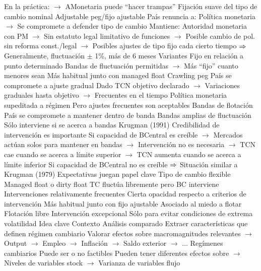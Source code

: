 \documentclass{nuevotema}
\begin{document}
\begin{esquemal}
				\4[] En la práctica:
				\4[] $\to$ AMonetaria puede ``hacer trampas''
		\2 Fijación suave del tipo de cambio nominal
			\3 Adjustable peg/fijo ajustable
				\4 País renuncia a:
				\4[] Política monetaria
				\4[] $\to$ Se compromete a defender tipo de cambio
				\4 Mantiene:
				\4[] Autoridad monetaria con PM
				\4[] $\to$ Sin estatuto legal limitativo de funciones
				\4[] $\to$ Posible cambio de pol. sin reforma const./legal
				\4[] $\to$ Posibles ajustes de tipo fijo cada cierto tiempo
				\4[] $\then$ Generalmente, fluctuación $\pm$ 1\%, más de 6 meses
				\4 Variantes
				\4[] Fijo en relación a punto determinado
				\4[] Bandas de fluctuación permitidas
				\4[] $\to$ Más ``fijo'' cuanto menores sean
				\4 Más habitual junto con managed float
			\3 Crawling peg
				\4 País se compromete a ajuste gradual
				\4[] Dado TCN objetivo declarado
				\4[] $\to$ Variaciones graduales hasta objetivo
				\4[] $\to$ Frecuentes en el tiempo
				\4 Política monetaria supeditada a régimen
				\4[] Pero ajustes frecuentes son aceptables
			\3 Bandas de flotación
				\4 País se compromete a mantener dentro de banda
				\4 Bandas amplias de fluctuación
				\4[] Sólo interviene si se acerca a bandas
				\4 Krugman (1991)
				\4[] Credibilidad de intervención es importante
				\4[] Si capacidad de BCentral es creíble
				\4[] $\to$ Mercados actúan solos para mantener en bandas
				\4[] $\to$ Intervención no es necesaria
				\4[] $\to$ TCN cae cuando se acerca a límite superior
				\4[] $\to$ TCN aumenta cuando se acerca a límite inferior
				\4[] Si capacidad de BCentral no es creíble
				\4[] $\then$ Situación similar a Krugman (1979)
				\4[$\then$] Expectativas juegan papel clave
		\2 Tipo de cambio flexible
			\3 Managed float o dirty float
				\4 TC fluctúa libremente pero BC interviene
				\4 Intervenciones relativamente frecuentes
				\4 Cierta opacidad respecto a criterios de intervención
				\4 Más habitual junto con fijo ajustable
				\4 Asociado al miedo a flotar
			\3 Flotación libre
				\4 Intervención excepcional
				\4 Sólo para evitar condiciones de extrema volatilidad
	\1 
		\2 Idea clave
			\3 Contexto
				\4 Análisis comparado
				\4[] Extraer características que definen régimen cambiario
				\4[] Valorar efectos sobre macromagnitudes relevantes
				\4[] $\to$ Output
				\4[] $\to$ Empleo
				\4[] $\to$ Inflación
				\4[] $\to$ Saldo exterior
				\4[] $\to$ ...
				\4 Regímenes cambiarios
				\4[] Puede ser o no factibles
				\4[] Pueden tener diferentes efectos sobre
				\4[] $\to$ Niveles de variables stock
				\4[] $\to$ Varianza de variables flujo

\end{esquemal}
\end{document}
